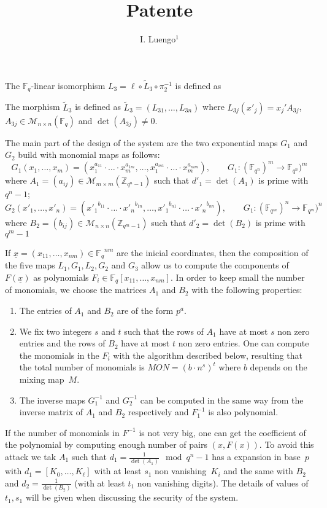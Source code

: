 \documentclass[12pt,a4paper]{amsart}
\title{Patente}
\author[I. Luengo]{I. Luengo${^1}$}
\date{}
\theoremstyle{remark}
\theoremstyle{definition}
\newcommand\gfq{{\mathbb{F}_q}}
\begin{document}
 

\maketitle


The $\mathbb{F}_q$-linear isomorphism $L_3=\ell\circ\tilde{L}_3\circ\pi_2^{-1}$
is defined as
\begin{center}

\end{center}
The morphism $\tilde{L}_3$ is defined as $\tilde{L}_3=(L_{31},\dots,L_{3n})$ where
$L_{3j}(x'_j)=x_j' A_{3j}$, $A_{3j}\in\mathscr{M}_{n\times n}(\gfq)$ and
$\det(A_{3j})\neq 0$.

The main part of the design of the system are the two exponential maps
$G_1$ and $G_2$ build with monomial maps as follows:
\[
G_1(x_1,\dots,x_m)=(x_1^{a_{11}}\cdot\ldots\cdot x_m^{a_{1m}},\dots,x_1^{a_{m1}}\cdot\ldots\cdot x_m^{a_{mm}}),\qquad 
G_1:(\mathbb{F}_{q^n})^m\to\mathbb{F}_{q^n})^m
\]
where $A_1=(a_{ij})\in\mathscr{M}_{m\times m}(\mathbb{Z}_{q^n-1})$ such that $d'_1=\det(A_1)$ is prime with $q^n-1$;
\[
G_2(x'_1,\dots,x'_n)=({x'_1}^{b_{11}}\cdot\ldots\cdot {x'_n}^{b_{1n}},\dots,{x'_1}^{b_{n1}}\cdot\ldots\cdot {x'_n}^{b_{nn}}),\qquad 
G_1:(\mathbb{F}_{q^m})^n\to\mathbb{F}_{q^m})^n
\]
where $B_2=(b_{ij})\in\mathscr{M}_{n\times n}(\mathbb{Z}_{q^m-1})$ such that $d'_2=\det(B_2)$ is prime with $q^m-1$

If $\underline{x}=(x_{11},\dots,x_{nm})\in\gfq^{nm}$ are the inicial coordinates, then
the composition of the five maps $L_1,G_1,L_2,G_2$ and $G_3$ allow us to compute 
the components of $F(\underline{x})$ as polynomials 
$F_i\in\mathbb{F}_q[x_{11},\dots,x_{nm}]$. In order to keep small the number
of monomials, we choose the matrices $A_1$ and $B_2$ with the following properties:

\begin{enumerate}
 \item The entries of $A_1$ and $B_2$ are of the form $p^a$.
 \item We fix two integers $s$ and $t$ such that the rows of $A_1$
 have at most $s$ non zero entries and the rows of $B_2$ have at most
 $t$ non zero entries. One can compute the monomials in the $F_i$
 with the algorithm described below, resulting that the total number
 of monomials is 
$MON=(b\cdot n^s)^t$ where $b$ depends on the mixing map~$M$.
\item The inverse maps $G_1^{-1}$ and $G_2^{-1}$ can be computed in the same
way from the inverse matrix of $A_1$ and $B_2$ respectively and
$F_1^{-1}$ is also polynomial.
\end{enumerate}
If the number of monomials in $F^{-1}$ is not very big, one can get the coefficient
of the polynomial by computing enough number of pairs $(x,F(x))$. To avoid
this attack we tak $A_1$ such that $d_1=\frac{1}{\det(A_1)}\mod{q^n-1}$
has a expansion in base~$p$ with $d_1=[K_0,\dots,K_\ell]$ with at least $s_1$
non vanishing~$K_i$ and the same with $B_2$ and $d_2=\frac{1}{\det(B_2)}$
(with at least $t_1$ non vanishing digits). The details of values of $t_1,s_1$
will be given when discussing the security of the system.
\end{document}
